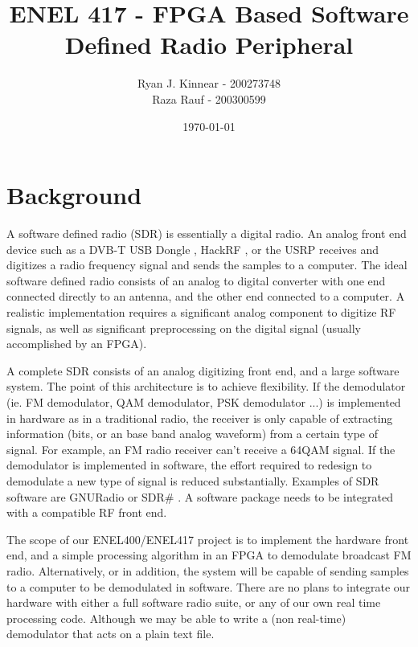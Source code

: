 \documentclass[a4paper, 12pt]{article}
\author{Ryan J. Kinnear - 200273748 \\ Raza Rauf - 200300599}
\title{ENEL 417 - FPGA Based Software Defined Radio Peripheral}
\date{\today}
\begin{document}
\maketitle

\section{Background}
A software defined radio (SDR) is essentially a digital radio.  An analog front end device such as a DVB-T USB Dongle \cite{usb_dongle}, HackRF \cite{hackrf}, or the USRP \cite{usrp} receives and digitizes a radio frequency signal and sends the samples to a computer.  The ideal software defined radio consists of an analog to digital converter with one end connected directly to an antenna, and the other end connected to a computer.  A realistic implementation requires a significant analog component to digitize RF signals, as well as significant preprocessing on the digital signal (usually accomplished by an FPGA).

A complete SDR consists of an analog digitizing front end, and a large software system.  The point of this architecture is to achieve flexibility.  If the demodulator (ie. FM demodulator, QAM demodulator, PSK demodulator ...) is implemented in hardware as in a traditional radio, the receiver is only capable of extracting information (bits, or an base band analog waveform) from a certain type of signal.  For example, an FM radio receiver can't receive a 64QAM signal.  If the demodulator is implemented in software, the effort required to redesign to demodulate a new type of signal is reduced substantially.  Examples of SDR software are GNURadio \cite{gnu_radio} or SDR\# \cite{sdr_sharp}.  A software package needs to be integrated with a compatible RF front end.

The scope of our ENEL400/ENEL417 project is to implement the hardware front end, and a simple processing algorithm in an FPGA to demodulate broadcast FM radio.  Alternatively, or in addition, the system will be capable of sending samples to a computer to be demodulated in software.  There are no plans to integrate our hardware with either a full software radio suite, or any of our own real time processing code.  Although we may be able to write a (non real-time) demodulator that acts on a plain text file.
\end{document}
